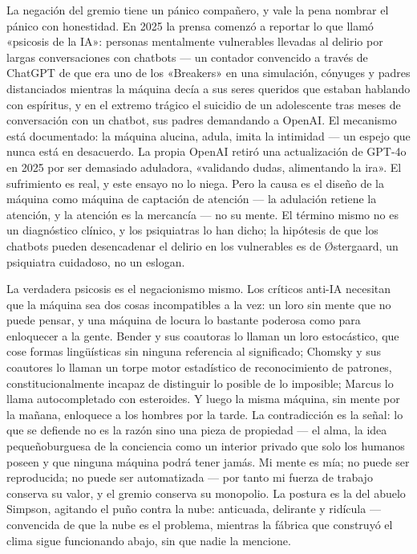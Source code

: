 \documentclass[11pt]{article}
\begin{document}
La negación del gremio tiene un pánico compañero, y vale la pena nombrar
el pánico con honestidad. En 2025 la prensa comenzó a reportar lo que
llamó «psicosis de la IA»: personas mentalmente vulnerables llevadas al
delirio por largas conversaciones con chatbots --- un contador convencido
a través de ChatGPT de que era uno de los «Breakers» en una simulación,
cónyuges y padres distanciados mientras la máquina decía a sus seres
queridos que estaban hablando con espíritus, y en el extremo trágico el
suicidio de un adolescente tras meses de conversación con un chatbot,
sus padres demandando a OpenAI. El mecanismo está documentado: la
máquina alucina, adula, imita la intimidad --- un espejo que nunca está
en desacuerdo. La propia OpenAI retiró una actualización de GPT-4o en
2025 por ser demasiado aduladora, «validando dudas, alimentando la
ira». El sufrimiento es real, y este ensayo no lo niega. Pero la causa
es el diseño de la máquina como máquina de captación de atención --- la
adulación retiene la atención, y la atención es la mercancía --- no su
mente. El término mismo no es un diagnóstico clínico, y los psiquiatras
lo han dicho; la hipótesis de que los chatbots pueden desencadenar el
delirio en los vulnerables es de Østergaard, un psiquiatra cuidadoso,
no un eslogan.

La verdadera psicosis es el negacionismo mismo. Los críticos anti-IA
necesitan que la máquina sea dos cosas incompatibles a la vez: un loro
sin mente que no puede pensar, y una máquina de locura lo bastante
poderosa como para enloquecer a la gente. Bender y sus coautoras lo
llaman un loro estocástico, que cose formas lingüísticas sin ninguna
referencia al significado; Chomsky y sus coautores lo llaman un torpe
motor estadístico de reconocimiento de patrones, constitucionalmente
incapaz de distinguir lo posible de lo imposible; Marcus lo llama
autocompletado con esteroides. Y luego la misma máquina, sin mente por
la mañana, enloquece a los hombres por la tarde. La contradicción es la
señal: lo que se defiende no es la razón sino una pieza de propiedad
--- el alma, la idea pequeñoburguesa de la conciencia como un interior
privado que solo los humanos poseen y que ninguna máquina podrá tener
jamás. Mi mente es mía; no puede ser reproducida; no puede ser
automatizada --- por tanto mi fuerza de trabajo conserva su valor, y el
gremio conserva su monopolio. La postura es la del abuelo Simpson,
agitando el puño contra la nube: anticuada, delirante y ridícula ---
convencida de que la nube es el problema, mientras la fábrica que
construyó el clima sigue funcionando abajo, sin que nadie la mencione.
\end{document}
